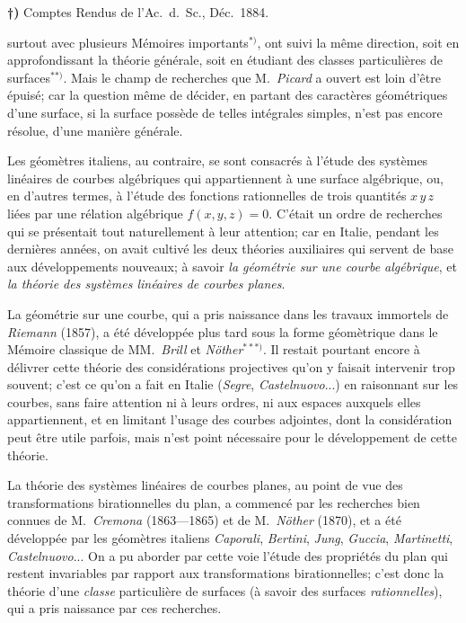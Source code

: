 \documentclass{article}
\begin{document}
\textbf{†)} Comptes Rendus de l'Ac.\ d.\ Sc., Déc.\ 1884.

surtout avec plusieurs Mémoires importants${}^{*)}$, ont suivi la même direction, soit en approfondissant la théorie générale, soit en étudiant des classes particulières de surfaces${}^{**)}$. Mais le champ de recherches que M.\ \emph{Picard} a ouvert est loin d'être épuisé; car la question même de décider, en partant des caractères géométriques d'une surface, si la surface possède de telles intégrales simples, n'est pas encore résolue, d'une manière générale.

Les géomètres italiens, au contraire, se sont consacrés à l'étude des systèmes linéaires de courbes algébriques qui appartiennent à une surface algébrique, ou, en d'autres termes, à l'étude des fonctions rationnelles de trois quantités $x\,y\,z$ liées par une rélation algébrique $f(x, y, z) = 0$. C'était un ordre de recherches qui se présentait tout naturellement à leur attention; car en Italie, pendant les dernières années, on avait cultivé les deux théories auxiliaires qui servent de base aux développements nouveaux; à savoir \emph{la géométrie sur une courbe algébrique}, et \emph{la théorie des systèmes linéaires de courbes planes}.

La géométrie sur une courbe, qui a pris naissance dans les travaux immortels de \emph{Riemann} (1857), a été développée plus tard sous la forme géomètrique dans le Mémoire classique de MM.\ \emph{Brill} et \emph{Nöther}${}^{***)}$. Il restait pourtant encore à délivrer cette théorie des considérations projectives qu'on y faisait intervenir trop souvent; c'est ce qu'on a fait en Italie (\emph{Segre}, \emph{Castelnuovo}...) en raisonnant sur les courbes, sans faire attention ni à leurs ordres, ni aux espaces auxquels elles appartiennent, et en limitant l'usage des courbes adjointes, dont la considération peut être utile parfois, mais n'est point nécessaire pour le développement de cette théorie.

La théorie des systèmes linéaires de courbes planes, au point de vue des transformations birationnelles du plan, a commencé par les recherches bien connues de M.\ \emph{Cremona} (1863---1865) et de M.\ \emph{Nöther} (1870), et a été développée par les géomètres italiens \emph{Caporali}, \emph{Bertini}, \emph{Jung}, \emph{Guccia}, \emph{Martinetti}, \emph{Castelnuovo}... On a pu aborder par cette voie l'étude des propriétés du plan qui restent invariables par rapport aux transformations birationnelles; c'est donc la théorie d'une \emph{classe} particulière de surfaces (à savoir des surfaces \emph{rationnelles}), qui a pris naissance par ces recherches.
\end{document}
